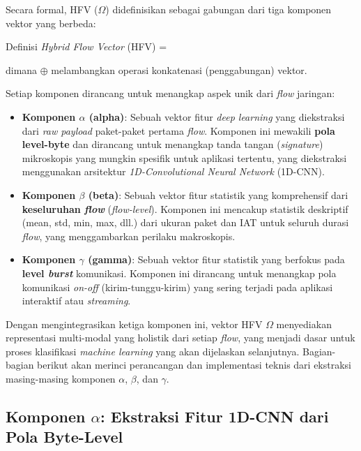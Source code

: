 Secara formal, HFV ($\Omega$) didefinisikan sebagai gabungan dari tiga komponen vektor yang berbeda:
\begin{myequation}{Definisi \textit{Hybrid Flow Vector} (HFV)}
    \label{eq:hfv_general}
    \Omega = \alpha \oplus \beta \oplus \gamma
\end{myequation}
dimana $\oplus$ melambangkan operasi konkatenasi (penggabungan) vektor.

Setiap komponen dirancang untuk menangkap aspek unik dari \textit{flow} jaringan:
\begin{itemize}
    \item \textbf{Komponen $\alpha$ (alpha)}: Sebuah vektor fitur \textit{deep learning} yang diekstraksi dari \textit{raw payload} paket-paket pertama \textit{flow}. Komponen ini mewakili \textbf{pola level-byte} dan dirancang untuk menangkap tanda tangan (\textit{signature}) mikroskopis yang mungkin spesifik untuk aplikasi tertentu, yang diekstraksi menggunakan arsitektur \textit{1D-Convolutional Neural Network} (1D-CNN).

    \item \textbf{Komponen $\beta$ (beta)}: Sebuah vektor fitur statistik yang komprehensif dari \textbf{keseluruhan \textit{flow}} (\textit{flow-level}). Komponen ini mencakup statistik deskriptif (mean, std, min, max, dll.) dari ukuran paket dan IAT untuk seluruh durasi \textit{flow}, yang menggambarkan perilaku makroskopis.

    \item \textbf{Komponen $\gamma$ (gamma)}: Sebuah vektor fitur statistik yang berfokus pada \textbf{level \textit{burst}} komunikasi. Komponen ini dirancang untuk menangkap pola komunikasi \textit{on-off} (kirim-tunggu-kirim) yang sering terjadi pada aplikasi interaktif atau \textit{streaming}.
\end{itemize}

Dengan mengintegrasikan ketiga komponen ini, vektor HFV $\Omega$ menyediakan representasi multi-modal yang holistik dari setiap \textit{flow}, yang menjadi dasar untuk proses klasifikasi \textit{machine learning} yang akan dijelaskan selanjutnya. Bagian-bagian berikut akan merinci perancangan dan implementasi teknis dari ekstraksi masing-masing komponen $\alpha$, $\beta$, dan $\gamma$.

\subsection{Komponen \texorpdfstring{$\alpha$}{alpha}: Ekstraksi Fitur 1D-CNN dari Pola Byte-Level}
\label{subsec:komponen_alpha}

